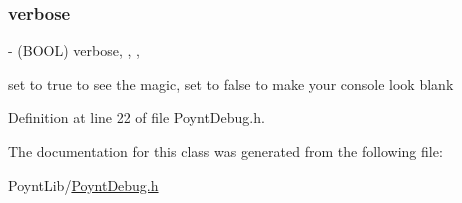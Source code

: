 \subsubsection{\texorpdfstring{verbose}{verbose}}
{\footnotesize\ttfamily -\/ (B\+O\+OL) verbose\hspace{0.3cm}{\ttfamily [read]}, {\ttfamily [write]}, {\ttfamily [nonatomic]}, {\ttfamily [assign]}}



set to true to see the magic, set to false to make your console look blank 



Definition at line 22 of file Poynt\+Debug.\+h.



The documentation for this class was generated from the following file\+:\begin{DoxyCompactItemize}
\item 
Poynt\+Lib/\hyperlink{_poynt_debug_8h}{Poynt\+Debug.\+h}\end{DoxyCompactItemize}
